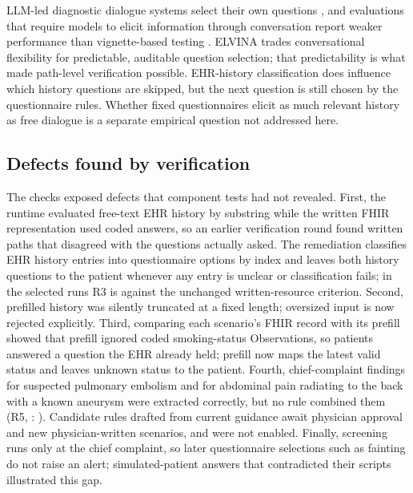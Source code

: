 LLM-led diagnostic dialogue systems select their own questions
\citep{tuConversationalDiagnosticArtificial2025}, and evaluations that require
models to elicit information through conversation report weaker performance than
vignette-based testing \citep{johriCraftMd2025,schmidgallAgentClinic2024}. ELVINA
trades conversational flexibility for predictable, auditable question selection;
that predictability is what made path-level verification possible. EHR-history
classification does influence which history questions are skipped, but the next
question is still chosen by the questionnaire rules. Whether fixed questionnaires
elicit as much relevant history as free dialogue is a separate empirical question
not addressed here.

\subsection{Defects found by verification}
The checks exposed defects that component tests had not revealed. First, the
runtime evaluated free-text EHR history by substring while the written FHIR
representation used coded answers, so an earlier verification round found written
paths that disagreed with the questions actually asked. The remediation classifies
EHR history entries into questionnaire options by index and leaves both history
questions to the patient whenever any entry is unclear or classification fails;
in the selected runs R3 is \RThreeVerdict{} against the unchanged written-resource
criterion. Second, prefilled history was silently truncated at a fixed length;
oversized input is now rejected explicitly. Third, comparing each scenario's FHIR
record with its prefill showed that prefill ignored coded smoking-status
Observations, so patients answered a question the EHR already held; prefill now
maps the latest valid status and leaves unknown status to the patient. Fourth,
chief-complaint findings for
suspected pulmonary embolism and for abdominal pain radiating to the back with a
known aneurysm were extracted correctly, but no rule combined them (R5,
\RFiveVerdict{}: \RFiveFailingScripts{}). Candidate rules drafted from current
guidance \citep{konstantinidesEscPe2020,wanhainenEsvsAaa2024} await physician
approval and new physician-written scenarios, and were not enabled. Finally,
screening runs only at the chief complaint, so later questionnaire selections such
as fainting do not raise an alert; simulated-patient answers that contradicted
their scripts illustrated this gap.

